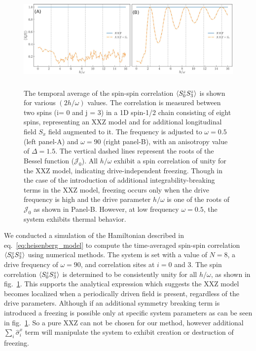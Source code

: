 \documentclass[aps,prb,reprint,showpacs,floatfix,superscriptaddress, onecolumn, nofootinbib, 9pt]{revtex4-2}
\begin{document}
\begin{enumerate}
{	\begin{figure}[t!]
		\includegraphics[height=5cm]{xxz_sx_low_high_fr.jpeg}
		\caption{The temporal average of the spin-spin correlation $\expval{S^z_0 S^z_3}$ is shown for various $(2h/\omega)$ values. The correlation is measured between two spins (i= 0 and j = 3) in a 1D spin-1/2 chain consisting of eight spins, representing an XXZ model and for additional longitudinal field $S_x$ field augmented to it. The frequency is adjusted to $\omega=0.5$ (left panel-A) and $\omega=90$ (right panel-B), with an anisotropy value of $\Delta=1.5$. The vertical dashed lines represent the roots of the Bessel function ($\mathcal{J}_0$). All $h/\omega$ exhibit a spin correlation of unity for the XXZ model, indicating drive-independent freezing. Though in the case of the introduction of additional integrability-breaking terms in the XXZ model, freezing occurs only when the drive frequency is high and the drive parameter $h/\omega$ is one of the roots of $\mathcal{J}_0$ as shown in Panel-B. However, at low frequency $\omega=0.5$, the system exhibits thermal behavior.}
		\label{fig:xxz}
	\end{figure}

	We conducted a simulation of the Hamiltonian described in eq.~\eqref{eq:heisenberg_model} to compute the time-averaged spin-spin correlation $\expval{S^z_0 S^z_3}$ using numerical methods. The system is set with a value of $N=8$, a drive frequency of $\omega=90$, and correlation sites at $i=0$ and $3$. The spin correlation $\expval{S^z_0 S^z_3}$ is determined to be consistently unity for all $h/\omega$, as shown in fig.~\ref{fig:xxz}. This supports the analytical expression which suggests the XXZ model becomes localized when a periodically driven field is present, regardless of the drive parameters. Although if an additional symmetry breaking term is introduced a freezing is possible only at specific system parameters as can be seen in fig.~\ref{fig:xxz}. So a pure XXZ can not be chosen for our method, however additional $\sum_i \hat{\sigma}^x_{i}$ term will manipulate the system to exhibit creation or destruction of freezing.
	}
	\end{enumerate}
	
\end{document}
